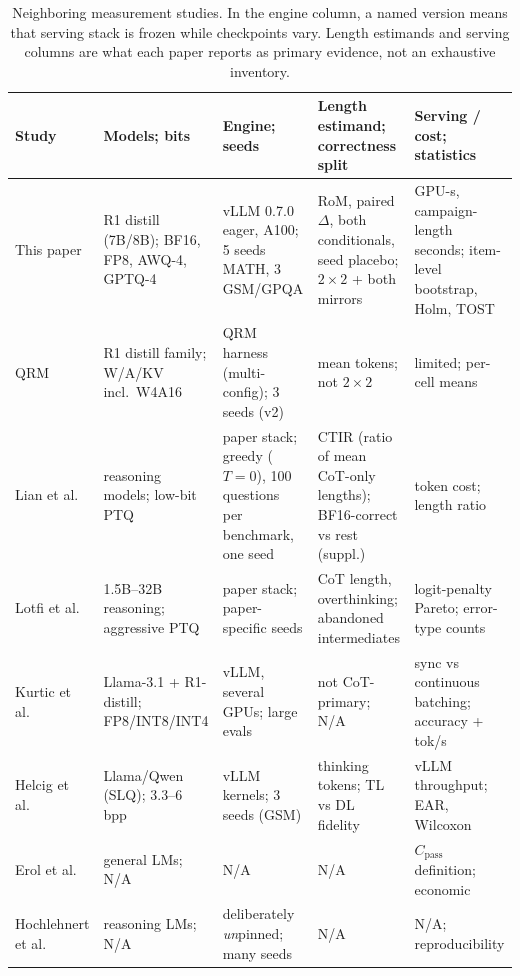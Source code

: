 \documentclass[11pt,a4paper]{article}
\begin{document}
\begin{table}[!htbp]
\centering
\caption{Neighboring measurement studies. In the engine column, a named version means that serving stack is frozen while checkpoints vary. Length estimands and serving columns are what each paper reports as primary evidence, not an exhaustive inventory.}
\label{tab:related}
\footnotesize
\setlength{\tabcolsep}{4pt}
\renewcommand{\arraystretch}{1.15}
\begin{tabularx}{\textwidth}{@{}>{\raggedright\arraybackslash}p{}*{4}{>{\raggedright\arraybackslash}X}@{}}
\toprule
\textbf{Study} & \textbf{Models; bits} & \textbf{Engine; seeds} & \textbf{Length estimand; correctness split} & \textbf{Serving / cost; statistics} \\
\midrule
This paper & 2 R1 distill (7B/8B); BF16, FP8, AWQ-4, GPTQ-4 & vLLM 0.7.0 eager, A100; 5 seeds MATH, 3 GSM/GPQA & RoM, paired $\Delta$, both conditionals, seed placebo; $2\times 2$ + both mirrors & GPU-s, campaign-length seconds; item-level bootstrap, Holm, TOST \\
QRM~\cite{liu2025qrm} & R1 distill family; W/A/KV incl.\ W4A16 & QRM harness (multi-config); 3 seeds (v2) & mean tokens; not $2\times 2$ & limited; per-cell means \\
Lian et al.~\cite{lian2026quantinflates} & reasoning models; low-bit PTQ & paper stack; greedy ($T=0$), 100 questions per benchmark, one seed & CTIR (ratio of mean CoT-only lengths); BF16-correct vs rest (suppl.) & token cost; length ratio \\
Lotfi et al.~\cite{lotfi2026overthinking} & 1.5B--32B reasoning; aggressive PTQ & paper stack; paper-specific seeds & CoT length, overthinking; abandoned intermediates & logit-penalty Pareto; error-type counts \\
Kurtic et al.~\cite{kurtic2025give} & Llama-3.1 + R1-distill; FP8/INT8/INT4 & vLLM, several GPUs; large evals & not CoT-primary; N/A & sync vs continuous batching; accuracy + tok/s \\
Helcig et al.~\cite{helcig2026slq} & Llama/Qwen (SLQ); 3.3--6 bpp & vLLM kernels; 3 seeds (GSM) & thinking tokens; TL vs DL fidelity & vLLM throughput; EAR, Wilcoxon \\
Erol et al.~\cite{erol2025costofpass} & general LMs; N/A & N/A & N/A & $C_{\mathrm{pass}}$ definition; economic \\
Hochlehnert et al.~\cite{hochlehnert2025sober} & reasoning LMs; N/A & deliberately \emph{un}pinned; many seeds & N/A & N/A; reproducibility \\
\bottomrule
\end{tabularx}
\end{table}
\end{document}
